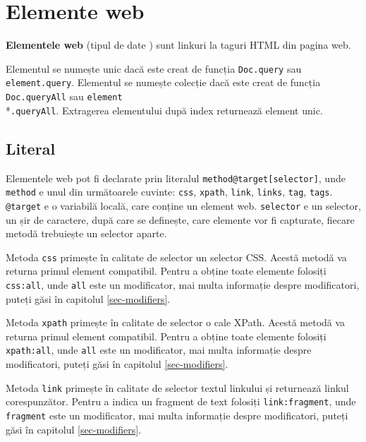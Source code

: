 \section{Elemente web}
\label{webelments}

{\bf Elementele web} (tipul de date \element) sunt linkuri la taguri HTML din pagina web.

Elementul se numește unic dacă este creat de funcția \texttt{Doc.query} sau \texttt{element.query}. Elementul se numește colecție dacă este creat de funcția \texttt{Doc.queryAll} sau \texttt{element}\\*\texttt{.queryAll}. Extragerea elementului după index returnează element unic. 

\subsection{Literal}

Elementele web pot fi declarate prin literalul \texttt{method@target[selector]}, unde \texttt{method} e unul din următoarele cuvinte: \texttt{css}, \texttt{xpath}, \texttt{link}, \texttt{links}, \texttt{tag}, \texttt{tags}. \texttt{@target} e o variabilă locală, care conține un element web. \texttt{selector} e un selector, un șir de caractere, după care se definește, care elemente vor fi capturate, fiecare metodă trebuiește un selector aparte.

Metoda \texttt{css} primește în calitate de selector un selector CSS. Acestă metodă va returna primul element compatibil. Pentru a obține toate elemente folosiți \texttt{css:all}, unde \texttt{all} este un modificator, mai multa informație despre modificatori, puteți găsi în capitolul \ref{sec-modifiers}.

Metoda \texttt{xpath} primește în calitate de selector o cale XPath. Acestă metodă va returna primul element compatibil. Pentru a obține toate elemente folosiți \texttt{xpath:all}, unde \texttt{all} este un modificator, mai multa informație despre modificatori, puteți găsi în capitolul \ref{sec-modifiers}.

Metoda \texttt{link} primește în calitate de selector textul linkului și returnează linkul corespunzător. Pentru a indica un fragment de text folosiți \texttt{link:fragment}, unde \texttt{fragment} este un modificator, mai multa informație despre modificatori, puteți găsi în capitolul \ref{sec-modifiers}.

